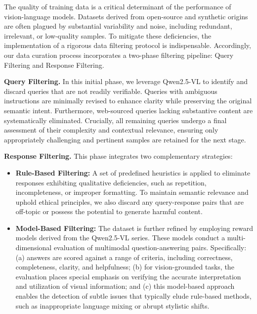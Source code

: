 \documentclass{article} %
\begin{document}
The quality of training data is a critical determinant of the performance of vision-language models. Datasets derived from open-source and synthetic origins are often plagued by substantial variability and noise, including redundant, irrelevant, or low-quality samples. To mitigate these deficiencies, the implementation of a rigorous data filtering protocol is indispensable. Accordingly, our data curation process incorporates a two-phase filtering pipeline: Query Filtering and Response Filtering.

\textbf{Query Filtering.} In this initial phase, we leverage Qwen2.5-VL to identify and discard queries that are not readily verifiable. Queries with ambiguous instructions are minimally revised to enhance clarity while preserving the original semantic intent. Furthermore, web-sourced queries lacking substantive content are systematically eliminated. Crucially, all remaining queries undergo a final assessment of their complexity and contextual relevance, ensuring only appropriately challenging and pertinent samples are retained for the next stage.

\textbf{Response Filtering.} This phase integrates two complementary strategies:

\begin{itemize}[itemindent=0pt, labelsep=4pt, leftmargin=*]

\item \textbf{Rule-Based Filtering:} A set of predefined heuristics is applied to eliminate responses exhibiting qualitative deficiencies, such as repetition, incompleteness, or improper formatting. To maintain semantic relevance and uphold ethical principles, we also discard any query-response pairs that are off-topic or possess the potential to generate harmful content.

\item \textbf{Model-Based Filtering:} The dataset is further refined by employing reward models derived from the Qwen2.5-VL series. These models conduct a multi-dimensional evaluation of multimodal question-answering pairs. Specifically: (a) answers are scored against a range of criteria, including correctness, completeness, clarity, and helpfulness; (b) for vision-grounded tasks, the evaluation places special emphasis on verifying the accurate interpretation and utilization of visual information; and (c) this model-based approach enables the detection of subtle issues that typically elude rule-based methods, such as inappropriate language mixing or abrupt stylistic shifts.

\end{itemize}
\end{document}
